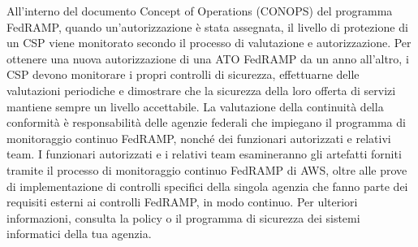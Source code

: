 \documentclass[../main.tex]{subfiles}
\begin{document}
All'interno del documento Concept of Operations (CONOPS) del programma FedRAMP, quando un'autorizzazione è stata assegnata, il livello di protezione di un CSP viene monitorato secondo il processo di valutazione e autorizzazione. Per ottenere una nuova autorizzazione di una ATO FedRAMP da un anno all'altro, i CSP devono monitorare i propri controlli di sicurezza, effettuarne delle valutazioni periodiche e dimostrare che la sicurezza della loro offerta di servizi mantiene sempre un livello accettabile. La valutazione della continuità della conformità è responsabilità delle agenzie federali che impiegano il programma di monitoraggio continuo FedRAMP, nonché dei funzionari autorizzati e relativi team. I funzionari autorizzati e i relativi team esamineranno gli artefatti forniti tramite il processo di monitoraggio continuo FedRAMP di AWS, oltre alle prove di implementazione di controlli specifici della singola agenzia che fanno parte dei requisiti esterni ai controlli FedRAMP, in modo continuo. Per ulteriori informazioni, consulta la policy o il programma di sicurezza dei sistemi informatici della tua agenzia.
\end{document}
